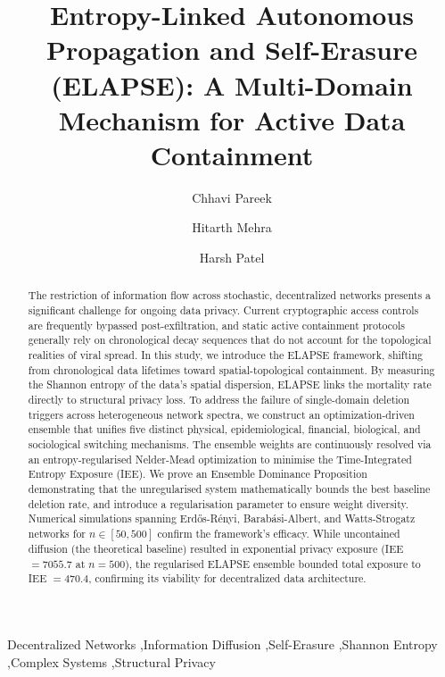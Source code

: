 \documentclass[review,12pt]{elsarticle}
\begin{document}
\begin{frontmatter}

\title{Entropy-Linked Autonomous Propagation and Self-Erasure (ELAPSE): A Multi-Domain Mechanism for Active Data Containment}

\author[1]{Chhavi Pareek}
\author[1]{Hitarth Mehra}
\author[1]{Harsh Patel}

\address[1]{Dept of CSE, RV College of Engineering, Bangalore}

\begin{abstract}
The restriction of information flow across stochastic, decentralized networks presents a significant challenge for ongoing data privacy. Current cryptographic access controls are frequently bypassed post-exfiltration, and static active containment protocols generally rely on chronological decay sequences that do not account for the topological realities of viral spread. In this study, we introduce the ELAPSE framework, shifting from chronological data lifetimes toward spatial-topological containment. By measuring the Shannon entropy of the data's spatial dispersion, ELAPSE links the mortality rate directly to structural privacy loss. To address the failure of single-domain deletion triggers across heterogeneous network spectra, we construct an optimization-driven ensemble that unifies five distinct physical, epidemiological, financial, biological, and sociological switching mechanisms. The ensemble weights are continuously resolved via an entropy-regularised Nelder-Mead optimization to minimise the Time-Integrated Entropy Exposure (IEE). We prove an Ensemble Dominance Proposition demonstrating that the unregularised system mathematically bounds the best baseline deletion rate, and introduce a regularisation parameter to ensure weight diversity. Numerical simulations spanning Erd\H{o}s-R\'enyi, Barab\'asi-Albert, and Watts-Strogatz networks for $n \in [50, 500]$ confirm the framework's efficacy. While uncontained diffusion (the theoretical baseline) resulted in exponential privacy exposure (IEE $= 7055.7$ at $n=500$), the regularised ELAPSE ensemble bounded total exposure to IEE $= 470.4$, confirming its viability for decentralized data architecture.
\end{abstract}

\begin{keyword}
Decentralized Networks \sep Information Diffusion \sep Self-Erasure \sep Shannon Entropy \sep Complex Systems \sep Structural Privacy
\end{keyword}

\end{frontmatter}
\end{document}
